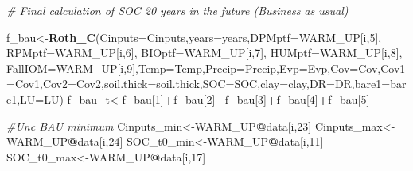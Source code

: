 \documentclass[
  10pt,
  b5paper,
]{book}
\newenvironment{Shaded}{\begin{snugshade}}{\end{snugshade}}
\newcommand{\CommentTok}[1]{\textcolor[rgb]{0.56,0.35,0.01}{\textit{#1}}}
\newcommand{\DataTypeTok}[1]{\textcolor[rgb]{0.13,0.29,0.53}{#1}}
\newcommand{\DecValTok}[1]{\textcolor[rgb]{0.00,0.00,0.81}{#1}}
\newcommand{\KeywordTok}[1]{\textcolor[rgb]{0.13,0.29,0.53}{\textbf{#1}}}
\newcommand{\NormalTok}[1]{#1}
\newcommand{\OperatorTok}[1]{\textcolor[rgb]{0.81,0.36,0.00}{\textbf{#1}}}
\begin{document}
\begin{Shaded}
\begin{Highlighting}[]
\CommentTok{# Final calculation of SOC  20 years in the future  (Business as usual)}

\NormalTok{f_bau<-}\KeywordTok{Roth_C}\NormalTok{(}\DataTypeTok{Cinputs=}\NormalTok{Cinputs,}\DataTypeTok{years=}\NormalTok{years,}\DataTypeTok{DPMptf=}\NormalTok{WARM_UP[i,}\DecValTok{5}\NormalTok{], }\DataTypeTok{RPMptf=}\NormalTok{WARM_UP[i,}\DecValTok{6}\NormalTok{], }\DataTypeTok{BIOptf=}\NormalTok{WARM_UP[i,}\DecValTok{7}\NormalTok{], }\DataTypeTok{HUMptf=}\NormalTok{WARM_UP[i,}\DecValTok{8}\NormalTok{], }\DataTypeTok{FallIOM=}\NormalTok{WARM_UP[i,}\DecValTok{9}\NormalTok{],}\DataTypeTok{Temp=}\NormalTok{Temp,}\DataTypeTok{Precip=}\NormalTok{Precip,}\DataTypeTok{Evp=}\NormalTok{Evp,}\DataTypeTok{Cov=}\NormalTok{Cov,}\DataTypeTok{Cov1=}\NormalTok{Cov1,}\DataTypeTok{Cov2=}\NormalTok{Cov2,}\DataTypeTok{soil.thick=}\NormalTok{soil.thick,}\DataTypeTok{SOC=}\NormalTok{SOC,}\DataTypeTok{clay=}\NormalTok{clay,}\DataTypeTok{DR=}\NormalTok{DR,}\DataTypeTok{bare1=}\NormalTok{bare1,}\DataTypeTok{LU=}\NormalTok{LU)}
\NormalTok{f_bau_t<-f_bau[}\DecValTok{1}\NormalTok{]}\OperatorTok{+}\NormalTok{f_bau[}\DecValTok{2}\NormalTok{]}\OperatorTok{+}\NormalTok{f_bau[}\DecValTok{3}\NormalTok{]}\OperatorTok{+}\NormalTok{f_bau[}\DecValTok{4}\NormalTok{]}\OperatorTok{+}\NormalTok{f_bau[}\DecValTok{5}\NormalTok{]}

\CommentTok{#Unc BAU minimum }
\NormalTok{Cinputs_min<-WARM_UP}\OperatorTok{@}\NormalTok{data[i,}\DecValTok{23}\NormalTok{]}
\NormalTok{Cinputs_max<-WARM_UP}\OperatorTok{@}\NormalTok{data[i,}\DecValTok{24}\NormalTok{]}
\NormalTok{SOC_t0_min<-WARM_UP}\OperatorTok{@}\NormalTok{data[i,}\DecValTok{11}\NormalTok{]}
\NormalTok{SOC_t0_max<-WARM_UP}\OperatorTok{@}\NormalTok{data[i,}\DecValTok{17}\NormalTok{]}


\end{Highlighting}
\end{Shaded}
\end{document}

